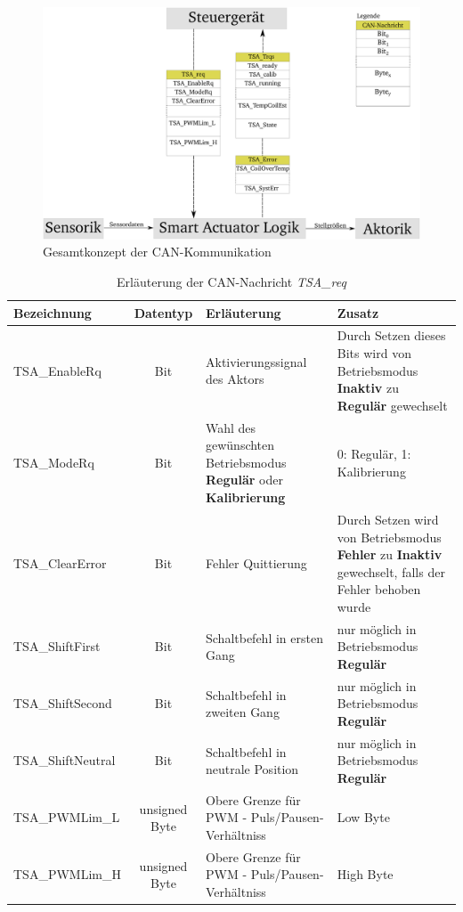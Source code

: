 \begin{figure}[h]%
\centering
\includegraphics[width=0.6\columnwidth]{./Bilder/fig_can_ov}%
\caption{Gesamtkonzept der CAN-Kommunikation}%
\label{fig_can_ov}%
\end{figure}

\begin{table}%
\centering
\begin{tabular}{l c p{6cm} p{4cm}}
\hline
Bezeichnung & Datentyp & Erläuterung & Zusatz \\
\hline
TSA\_EnableRq & Bit & Aktivierungssignal des Aktors & Durch Setzen dieses Bits wird von Betriebsmodus \textbf{Inaktiv} zu \textbf{Regulär} gewechselt \newline \\
TSA\_ModeRq & Bit & Wahl des gewünschten Betriebsmodus \textbf{Regulär} oder  \textbf{Kalibrierung }& 0: Regulär, 1: Kalibrierung \newline \\
TSA\_ClearError & Bit & Fehler Quittierung & Durch Setzen wird von Betriebsmodus \textbf{Fehler} zu \textbf{Inaktiv} gewechselt, falls der Fehler behoben wurde \newline \\
TSA\_ShiftFirst & Bit & Schaltbefehl in ersten Gang & nur möglich in Betriebsmodus \textbf{Regulär} \newline\\
TSA\_ShiftSecond & Bit & Schaltbefehl in zweiten Gang & nur möglich in Betriebsmodus \textbf{Regulär} \newline \\
TSA\_ShiftNeutral & Bit & Schaltbefehl in neutrale Position & nur möglich in Betriebsmodus \textbf{Regulär} \newline \\
TSA\_PWMLim\_L & unsigned Byte & Obere Grenze für PWM - Puls/Pausen- Verhältniss & Low Byte \newline \newline \\
TSA\_PWMLim\_H & unsigned Byte & Obere Grenze für PWM - Puls/Pausen- Verhältniss & High Byte \\
\end{tabular}
\caption{Erläuterung der CAN-Nachricht \textit{TSA\_req}}
\label{tab_tsa_req}
\end{table}

